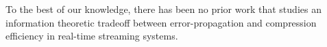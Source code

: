\documentclass[journal, twocolumn, 10pt]{IEEEtran}
\newcommand{\bof}[1]{\textbf{#1}}
\begin{document}
To the best of our knowledge, there has been no prior work that studies an information theoretic tradeoff between error-propagation and compression efficiency in real-time streaming systems.



%
%
%
%
%
%
%
%
%
% 
\end{document}
